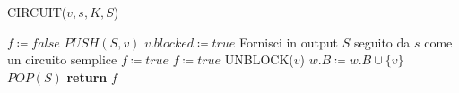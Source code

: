 \begin{algorithm}[h!] 
    \caption{CIRCUIT($v, s, K, S$)}\label{alg:circuit}
    \begin{algorithmic}[1]
        \State $f \coloneqq false$
        \State $PUSH(S, v)$
        \State $v.blocked \coloneqq true$
                \State Fornisci in output $S$ seguito da $s$ come un circuito semplice
                \State $f \coloneqq true$
             \State $f \coloneqq true$ \EndIf
            \EndIf
        \EndFor
         UNBLOCK($v$)
        \Else
                \State $w.B \coloneqq w.B \cup \{v\}$
            \EndFor
        \EndIf
        \State $POP(S)$ 
        \State \textbf{return} $f$
    \end{algorithmic}
\end{algorithm}

